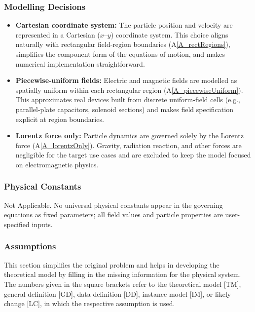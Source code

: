 \documentclass[12pt]{article}
\newcommand{\aref}[1]{A\ref{#1}}
\begin{document}
\subsubsection{Modelling Decisions}

\begin{itemize}
\item \textbf{Cartesian coordinate system:} The particle position and velocity are represented in
  a Cartesian ($x$--$y$) coordinate system. This choice aligns naturally with rectangular
  field-region boundaries (\aref{A_rectRegions}), simplifies the component form of the equations
  of motion, and makes numerical implementation straightforward.

\item \textbf{Piecewise-uniform fields:} Electric and magnetic fields are modelled as spatially
  uniform within each rectangular region (\aref{A_piecewiseUniform}). This approximates real
  devices built from discrete uniform-field cells (e.g., parallel-plate capacitors, solenoid
  sections) and makes field specification explicit at region boundaries.

\item \textbf{Lorentz force only:} Particle dynamics are governed solely by the Lorentz force
  (\aref{A_lorentzOnly}). Gravity, radiation reaction, and other forces are negligible for the
  target use cases and are excluded to keep the model focused on electromagnetic physics.
\end{itemize}

\subsubsection{Physical Constants}

Not Applicable. No universal physical constants appear in the governing equations as fixed
parameters; all field values and particle properties are user-specified inputs.

\subsubsection{Assumptions} \label{sec_assumpt}

This section simplifies the original problem and helps in developing the
theoretical model by filling in the missing information for the physical system.
The numbers given in the square brackets refer to the theoretical model [TM],
general definition [GD], data definition [DD], instance model [IM], or likely
change [LC], in which the respective assumption is used.
\end{document}
